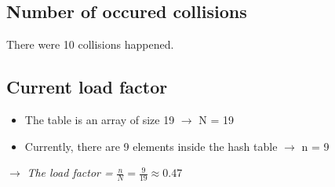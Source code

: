 \subsection{Number of occured collisions}
There were 10 collisions happened.

\subsection{Current load factor}
\begin{itemize}
    \item The table is an array of size 19 $\rightarrow$ N = 19
    \item Currently, there are 9 elements inside the hash table $\rightarrow$ n = 9
\end{itemize}
$\rightarrow$ \textit{The load factor = } $\frac{n}{N} = \frac{9}{19} \approx 0.47$